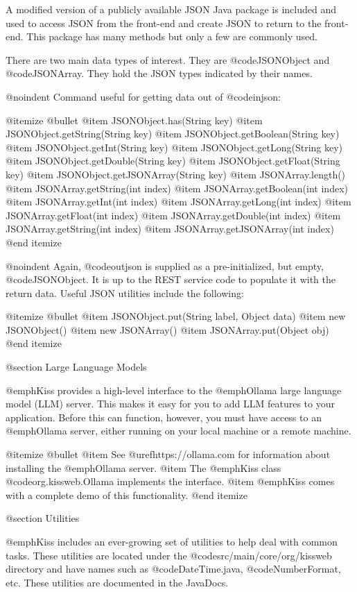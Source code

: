 A modified version of a publicly available JSON Java package is
included and used to access JSON from the front-end and create JSON to
return to the front-end.  This package has many methods but only a few are
commonly used.

There are two main data types of interest.  They are @code{JSONObject} and
@code{JSONArray}.  They hold the JSON types indicated by their names.

@noindent
Command useful for getting data out of @code{injson}:

@itemize @bullet
@item
JSONObject.has(String key)
@item
JSONObject.getString(String key)
@item
JSONObject.getBoolean(String key)
@item
JSONObject.getInt(String key)
@item
JSONObject.getLong(String key)
@item
JSONObject.getDouble(String key)
@item
JSONObject.getFloat(String key)
@item
JSONObject.getJSONArray(String key)
@item
JSONArray.length()
@item
JSONArray.getString(int index)
@item
JSONArray.getBoolean(int index)
@item
JSONArray.getInt(int index)
@item
JSONArray.getLong(int index)
@item
JSONArray.getFloat(int index)
@item
JSONArray.getDouble(int index)
@item
JSONArray.getString(int index)
@item
JSONArray.getJSONArray(int index)
@end itemize

@noindent
Again, @code{outjson} is supplied as a pre-initialized, but empty,
@code{JSONObject}.  It is up to the REST service code to populate it
with the return data.  Useful JSON utilities include the following:

@itemize @bullet
@item
JSONObject.put(String label, Object data)
@item
new JSONObject()
@item
new JSONArray()
@item
JSONArray.put(Object obj)
@end itemize

@section Large Language Models

@emph{Kiss} provides a high-level interface to the @emph{Ollama} large language model (LLM) server. This makes it easy for you to add LLM features to your application.
Before this can function, however, you must have access to an @emph{Ollama} server, either running on your local machine or a remote machine.

@itemize @bullet
@item
See @uref{https://ollama.com} for information about installing the @emph{Ollama} server.
@item
The @emph{Kiss} class @code{org.kissweb.Ollama} implements the interface.
@item
@emph{Kiss} comes with a complete demo of this functionality.
@end itemize

@section Utilities

@emph{Kiss} includes an ever-growing set of utilities to help deal with common tasks.
These utilities are located under the @code{src/main/core/org/kissweb} directory and have names such as
@code{DateTime.java}, @code{NumberFormat}, etc.  These utilities
are documented in the JavaDocs.
